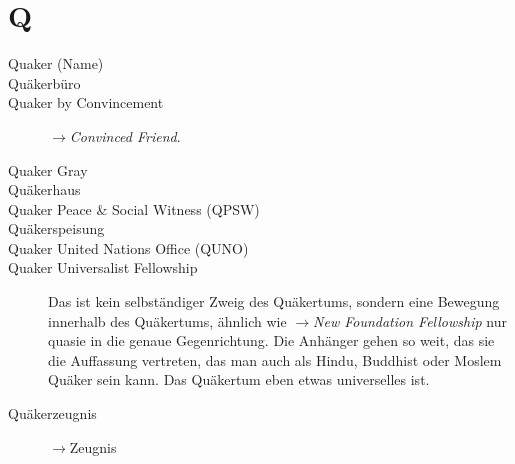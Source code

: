 \section*{Q}

\articlesize

\begin{description}

 \item[Quaker (Name)]

 \item[Quäkerbüro]

 \item[Quaker by Convincement] $\to$\textit{Convinced Friend}.

 \item[Quaker Gray]

 \item[Quäkerhaus]

 \item[Quaker Peace \& Social Witness (QPSW)]

 \item[Quäkerspeisung]

 \item[Quaker United Nations Office (QUNO)]

 \item[Quaker Universalist Fellowship] Das ist kein selbständiger Zweig des Quäkertums, sondern eine Bewegung innerhalb des Quäkertums, ähnlich wie $\to$\textit{New Foundation Fellowship} nur quasie in die genaue Gegenrichtung. Die Anhänger gehen so weit, das sie die Auffassung vertreten, das man auch als Hindu, Buddhist oder Moslem Quäker sein kann. Das Quäkertum eben etwas universelles ist.

 \item[Quäkerzeugnis] $\to$Zeugnis


 \end{description}

\normalsize
